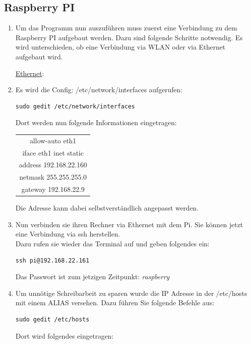 \documentclass{article}
\begin{document}
\subsection{Raspberry PI}
\begin{enumerate}
\item[] Um das Programm nun auszuführen muss zuerst eine Verbindung zu dem Raspberry PI aufgebaut werden. Dazu sind folgende Schritte notwendig. Es wird unterschieden, ob eine Verbindung via WLAN oder via Ethernet aufgebaut wird.
\begin{center}
\underline{Ethernet}:\\
\end{center}

\item Es wird die Config: /etc/network/interfaces aufgerufen:
\begin{verbatim}
sudo gedit /etc/network/interfaces

\end{verbatim}
Dort werden nun folgende Informationen eingetragen:\\

\begin{center}
\begin{tabular}{|c|}
\hline
allow-auto eth1\\
iface eth1 inet static\\
address 192.168.22.160\\
netmask 255.255.255.0\\
gateway 192.168.22.9\\
\hline
\end{tabular}


\end{center}

Die Adresse kann dabei selbstverständlich angepasst werden.

\item Nun verbinden sie ihren Rechner via Ethernet mit dem Pi. Sie können jetzt eine Verbindung via ssh herstellen.\\
Dazu rufen sie wieder das Terminal auf und geben folgendes ein:\\

\newpage
\begin{verbatim}
ssh pi@192.168.22.161
\end{verbatim}
Das Passwort ist zum jetzigen Zeitpunkt: \emph{raspberry}\\

\item Um unnötige Schreibarbeit zu sparen wurde die IP Adresse in der /etc/hosts mit einem ALIAS versehen. Dazu führen Sie folgende Befehle aus:
\begin{verbatim}
sudo gedit /etc/hosts
\end{verbatim}
Dort wird folgendes eingetragen:\\
\begin{center}


\end{center}
\end{enumerate}
\end{document}
